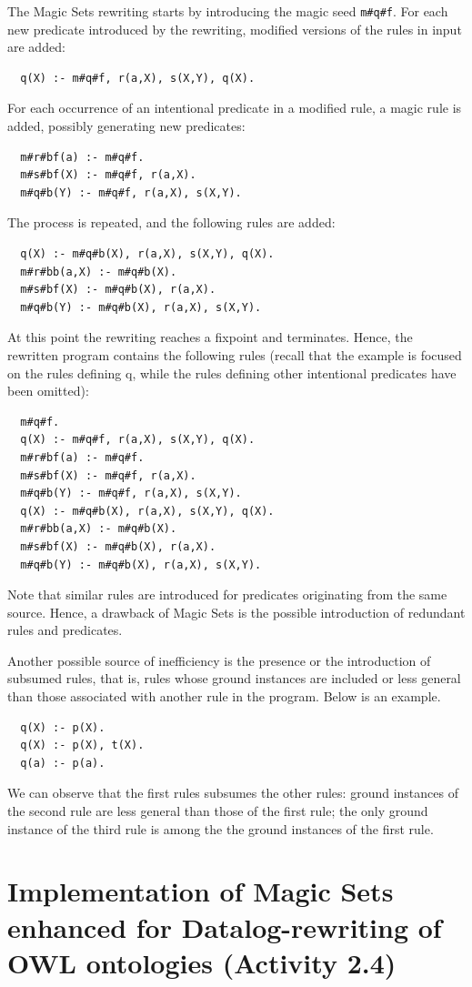 \documentclass[oneside]{book}
\begin{document}
The Magic Sets rewriting starts by introducing the magic seed {\tt m\#q\#f}. For each new predicate introduced by the rewriting, modified versions of the rules in input are added:
\begin{verbatim}
  q(X) :- m#q#f, r(a,X), s(X,Y), q(X).
\end{verbatim}
For each occurrence of an intentional predicate in a modified rule, a magic rule is added, possibly generating new predicates:
\begin{verbatim}
  m#r#bf(a) :- m#q#f.
  m#s#bf(X) :- m#q#f, r(a,X).
  m#q#b(Y) :- m#q#f, r(a,X), s(X,Y).
\end{verbatim}
The process is repeated, and the following rules are added:
\begin{verbatim}
  q(X) :- m#q#b(X), r(a,X), s(X,Y), q(X).
  m#r#bb(a,X) :- m#q#b(X).
  m#s#bf(X) :- m#q#b(X), r(a,X).
  m#q#b(Y) :- m#q#b(X), r(a,X), s(X,Y).
\end{verbatim}
At this point the rewriting reaches a fixpoint and terminates. Hence, the rewritten program contains the following rules (recall that the example is focused on the rules defining q, while the rules defining other intentional predicates have been omitted):
\begin{verbatim}
  m#q#f.
  q(X) :- m#q#f, r(a,X), s(X,Y), q(X).
  m#r#bf(a) :- m#q#f.
  m#s#bf(X) :- m#q#f, r(a,X).
  m#q#b(Y) :- m#q#f, r(a,X), s(X,Y).
  q(X) :- m#q#b(X), r(a,X), s(X,Y), q(X).
  m#r#bb(a,X) :- m#q#b(X).
  m#s#bf(X) :- m#q#b(X), r(a,X).
  m#q#b(Y) :- m#q#b(X), r(a,X), s(X,Y).
\end{verbatim}
Note that similar rules are introduced for predicates originating from the same source. Hence, a drawback of Magic Sets is the possible introduction of redundant rules and predicates.

Another possible source of inefficiency is the presence or the introduction of subsumed rules, that is, rules whose ground instances are included or less general than those associated with another rule in the program. Below is an example.
\begin{verbatim}
  q(X) :- p(X).
  q(X) :- p(X), t(X).
  q(a) :- p(a).
\end{verbatim}
We can observe that the first rules subsumes the other rules: ground instances of the second rule are less general than those of the first rule; the only ground instance of the third rule is among the the ground instances of the first rule.


\section{Implementation of Magic Sets enhanced for Datalog-rewriting of OWL ontologies (Activity 2.4)}
\end{document}
